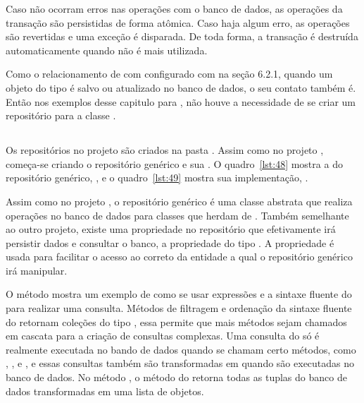 Caso não ocorram erros nas operações com o banco de dados, as operações da transação são persistidas de forma atômica. Caso haja algum erro, as operações são revertidas e uma exceção é disparada. De toda forma, a transação é destruída automaticamente quando não é mais utilizada.

Como o relacionamento de  com  configurado com  na seção 6.2.1, quando um objeto do tipo  é salvo ou atualizado no banco de dados, o seu contato também é. Então nos exemplos desse capitulo para , não houve a necessidade de se criar um repositório para a classe .

\subsection{}

Os repositórios no projeto  são criados na pasta . Assim como no projeto , começa-se criando o repositório genérico e sua . O quadro~\ref{lst:48} mostra a  do repositório genérico, , e o quadro~\ref{lst:49} mostra sua implementação, .



Assim como no projeto , o repositório genérico é uma classe abstrata que realiza operações no banco de dados para classes que herdam de . Também semelhante ao outro projeto, existe uma propriedade no repositório que efetivamente irá persistir dados e consultar o banco, a propriedade  do tipo . A propriedade  é usada para facilitar o acesso ao  correto da entidade a qual o repositório genérico irá manipular.

O método  mostra um exemplo de como se usar expressões  e a sintaxe fluente do  para realizar uma consulta. Métodos de filtragem e ordenação da sintaxe fluente do  retornam coleções do tipo , essa  permite que mais métodos sejam chamados em cascata para a criação de consultas complexas. Uma consulta do  só é realmente executada no bando de dados quando se chamam certo métodos, como , ,  e , e essas consultas também são transformadas em   quando são executadas no banco de dados. No método , o método  do  retorna todas as tuplas do banco de dados transformadas em uma lista de objetos.

